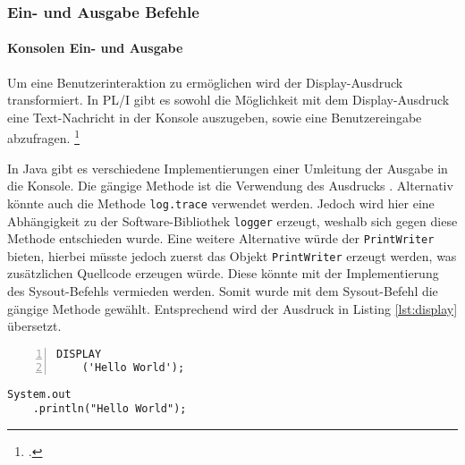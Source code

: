 




\pagebreak
\subsubsection{Ein- und Ausgabe Befehle}
\paragraph{Konsolen Ein- und Ausgabe}
Um eine Benutzerinteraktion zu ermöglichen wird der Display-Ausdruck transformiert.
In PL/I gibt es sowohl die Möglichkeit mit dem Display-Ausdruck eine Text-Nachricht in der Konsole auszugeben, sowie eine Benutzereingabe abzufragen. \footcite[Vgl. ][S. 264ff.]{pliref}

In Java gibt es verschiedene Implementierungen einer Umleitung der Ausgabe in die Konsole.
Die gängige Methode ist die Verwendung des Ausdrucks . 
Alternativ könnte auch die Methode \verb+log.trace+ verwendet werden.
Jedoch wird hier eine Abhängigkeit zu der Software-Bibliothek \verb+logger+  erzeugt, weshalb sich gegen diese Methode entschieden wurde.
Eine weitere Alternative würde der \verb+PrintWriter+ bieten, hierbei müsste jedoch zuerst das Objekt \verb+PrintWriter+ erzeugt werden, was zusätzlichen Quellcode erzeugen würde. Diese könnte mit der Implementierung des Sysout-Befehls vermieden werden.
Somit wurde mit dem Sysout-Befehl die gängige Methode gewählt. Entsprechend wird der Ausdruck in Listing \ref{lst:display} übersetzt.

\begin{minipage}[b]{0.48\linewidth}
	\centering
	\lstset{language=PL/I,label=SliceExaple}
	\begin{lstlisting}[frame=single, numbers=left, mathescape,%
		caption={Standardausgabe}, label={lst:display}]
	DISPLAY
	('Hello World');
	\end{lstlisting}
\end{minipage}
\hspace{0.5cm}
\begin{minipage}[b]{0.48\linewidth}
	\centering
	\lstset{language=Java,label=SliceExaple}
	\begin{lstlisting}[frame=single, mathescape,%
		title={" "}]
	System.out
	.println("Hello World");
	\end{lstlisting}
\end{minipage} 


